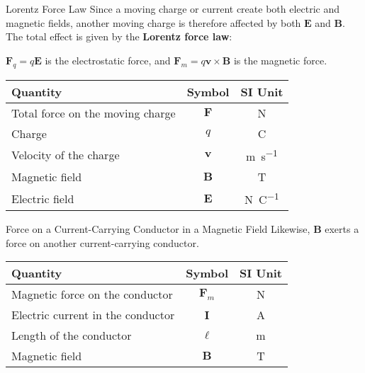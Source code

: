 \documentclass[12pt,aspectratio=169]{beamer}
\newcommand{\eq}[2]{\vspace{#1}{\Large\begin{displaymath}#2\end{displaymath}}}
\begin{document}
\begin{frame}{Lorentz Force Law}
  Since a moving charge or current create both electric and magnetic fields,
  another moving charge is therefore affected by both $\bm{E}$ and $\bm{B}$.
  The total effect is given by the \textbf{Lorentz force law}:

  \eq{-.2in}{
    \boxed{\bm{F}=q(\bm{E}+\bm{v}\times\bm{B})}
  }

  \vspace{-.1in}$\bm{F}_q=q\bm{E}$ is the electrostatic force, and
  $\bm{F}_m=q\bm{v}\times\bm{B}$ is the magnetic force.
  \begin{center}
    \begin{tabular}{l|c|c}
      \rowcolor{pink}
      \textbf{Quantity} & \textbf{Symbol} & \textbf{SI Unit} \\ \hline
      Total force on the moving charge & $\bm{F}$ & \si{\newton} \\
      Charge                 & $q$      & \si{\coulomb} \\
      Velocity of the charge & $\bm{v}$ & \si{\metre\per\second} \\
      Magnetic field         & $\bm{B}$ & \si{\tesla} \\
      Electric field         & $\bm{E}$ & \si{\newton\per\coulomb}
    \end{tabular}
  \end{center}
\end{frame}



\begin{frame}{Force on a Current-Carrying Conductor in a Magnetic Field}
  Likewise, $\bm{B}$ exerts a force on another current-carrying conductor.

  \eq{-.2in}{
    \boxed{F_m=\bm{I}\ell\times\bm{B}}
  }
  \begin{center}
    \begin{tabular}{l|c|c}
      \rowcolor{pink}
      \textbf{Quantity} & \textbf{Symbol} & \textbf{SI Unit} \\ \hline
      Magnetic force on the conductor   & $\bm{F}_m$ & \si{\newton} \\
      Electric current in the conductor & $\bm{I}$   & \si{\ampere} \\
      Length of the conductor           & $\ell$     & \si{\metre} \\
      Magnetic field                    & $\bm{B}$   & \si{\tesla}
    \end{tabular}
  \end{center}
\end{frame}
\end{document}
